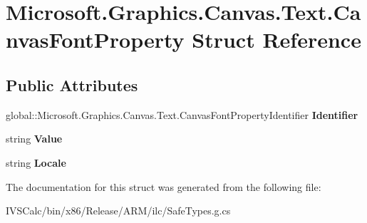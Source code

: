 \hypertarget{struct_microsoft_1_1_graphics_1_1_canvas_1_1_text_1_1_canvas_font_property}{}\section{Microsoft.\+Graphics.\+Canvas.\+Text.\+Canvas\+Font\+Property Struct Reference}
\label{struct_microsoft_1_1_graphics_1_1_canvas_1_1_text_1_1_canvas_font_property}
\subsection*{Public Attributes}
\begin{DoxyCompactItemize}
\item 
\mbox{\label{struct_microsoft_1_1_graphics_1_1_canvas_1_1_text_1_1_canvas_font_property_a072628b4d9792162b42ad8250a2454f4}} 
global\+::\+Microsoft.\+Graphics.\+Canvas.\+Text.\+Canvas\+Font\+Property\+Identifier {\bfseries Identifier}
\item 
\mbox{\label{struct_microsoft_1_1_graphics_1_1_canvas_1_1_text_1_1_canvas_font_property_a3e23860dc9547e36565d411d5eca4546}} 
string {\bfseries Value}
\item 
\mbox{\label{struct_microsoft_1_1_graphics_1_1_canvas_1_1_text_1_1_canvas_font_property_a5ee587c565bb8c35734fbcfab9abd64c}} 
string {\bfseries Locale}
\end{DoxyCompactItemize}


The documentation for this struct was generated from the following file\+:\begin{DoxyCompactItemize}
\item 
I\+V\+S\+Calc/bin/x86/\+Release/\+A\+R\+M/ilc/Safe\+Types.\+g.\+cs\end{DoxyCompactItemize}
